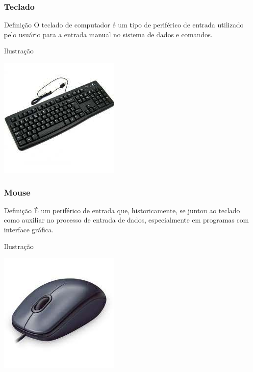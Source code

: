 \documentclass[aspectratio=169]{beamer} %
\begin{document}
\begin{frame}
	\frametitle{Teclado}
	
	\begin{block}{Defini\c cão}
		O teclado de computador é um tipo de periférico de entrada utilizado pelo usuário para a entrada manual no sistema de dados e comandos.
	\end{block}\vfill
	
	\begin{exampleblock}{Ilustra\c cão}
		\begin{center}
			\includegraphics[scale=0.4]{img/teclado}
		\end{center}
	\end{exampleblock}
\end{frame}

\begin{frame}
	\frametitle{Mouse}
	
	\begin{block}{Defini\c cão}
		É um periférico de entrada que, historicamente, se juntou ao teclado como auxiliar no processo de entrada de dados, especialmente em programas com interface gráfica.
	\end{block}\vfill
	
	\begin{exampleblock}{Ilustra\c cão}
		\begin{center}
			\includegraphics[scale=0.4]{img/mouse}
		\end{center}		
	\end{exampleblock}
\end{frame}
\end{document}
